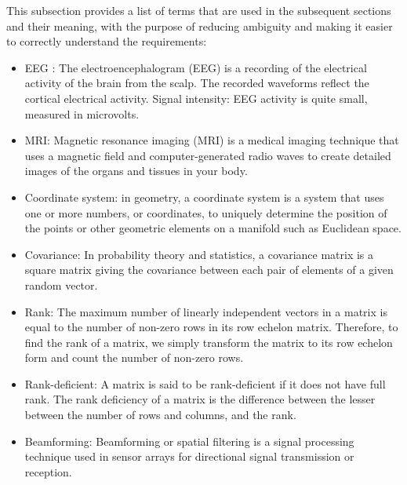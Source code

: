\documentclass[12pt]{article}
\begin{document}

This subsection provides a list of terms that are used in the subsequent
sections and their meaning, with the purpose of reducing ambiguity and making it
easier to correctly understand the requirements:

\begin{itemize} 

\item EEG : The electroencephalogram (EEG) is a recording of the electrical activity of the brain from the scalp. The recorded waveforms reflect the cortical electrical activity. Signal intensity: EEG activity is quite small, measured in microvolts.

\item MRI: Magnetic resonance imaging (MRI) is a medical imaging technique that uses a magnetic field and computer-generated radio waves to create detailed images of the organs and tissues in your body.

\item Coordinate system: in geometry, a coordinate system is a system that uses one or more numbers, or coordinates, to uniquely determine the position of the points or other geometric elements on a manifold such as Euclidean space.

\item Covariance: In probability theory and statistics, a covariance matrix is a square matrix giving the covariance between each pair of elements of a given random vector.

\item Rank: The maximum number of linearly independent vectors in a matrix is equal to the number of non-zero rows in its row echelon matrix. Therefore, to find the rank of a matrix, we simply transform the matrix to its row echelon form and count the number of non-zero rows.

\item Rank-deficient: A matrix is said to be rank-deficient if it does not have full rank. The rank deficiency of a matrix is the difference between the lesser between the number of rows and columns, and the rank.

\item Beamforming:  Beamforming or spatial filtering is a signal processing technique used in sensor arrays for directional signal transmission or reception.

\end{itemize}
\end{document}
